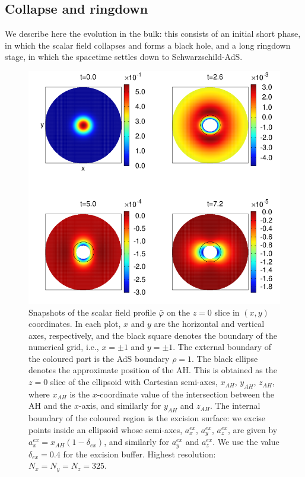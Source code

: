 \documentclass[a4paper,11pt]{article}
\numberwithin{equation}{section}
\begin{document}
\subsection{Collapse and ringdown}\label{sec:rescolring}

We describe here the evolution in the bulk: this consists of an initial short phase, in which the scalar field collapses and forms a black hole, and a long ringdown stage, in which the spacetime settles down to Schwarzschild-AdS. 

\begin{figure}[t!]
        \centering
        \includegraphics[width=5.2in,clip=true]{plots/bulkplots/L3/phi1/phi1_L3_snapshots_2by2.png}
\parbox{5.0in}{\caption{Snapshots of the scalar field profile $\bar{\varphi}$ on the $z=0$ slice in $(x,y)$ coordinates. In each plot, $x$ and $y$ are the horizontal and vertical axes, respectively, and the black square denotes the boundary of the numerical grid, i.e., $x=\pm 1$ and $y=\pm 1$. The external boundary of the coloured part is the AdS boundary $\rho=1$. The black ellipse denotes the approximate position of the AH. This is obtained as the $z=0$ slice of the ellipsoid with Cartesian semi-axes, $x_{AH}$, $y_{AH}$, $z_{AH}$, where $x_{AH}$ is the $x$-coordinate value of the intersection between the AH and the $x$-axis, and similarly for $y_{AH}$ and $z_{AH}$.
The internal boundary of the coloured region is the excision surface: we excise points inside an ellipsoid whose semi-axes, $a_x^{ex}$, $a_y^{ex}$, $a_z^{ex}$, are given by $a_x^{ex}=x_{AH}(1-\delta_{ex})$, and similarly for $a_y^{ex}$ and $a_z^{ex}$. We use the value $\delta_{ex}=0.4$ for the excision buffer. Highest resolution: $N_x=N_y=N_z=325$.
        }\label{fig:snapshotsscalarfield}}
\end{figure}
\end{document}
